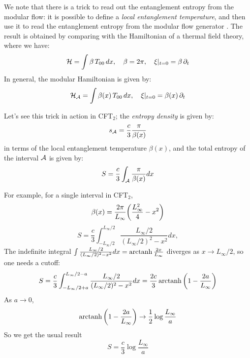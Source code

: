 \documentclass[11pt,a4paper]{article}
\begin{document}
	We note that there is a trick to read out the entanglement entropy from the modular flow: it is possible to define a \textit{local entanglement temperature}, and then use it to read the entanglement entropy from the modular flow generator \cite{Cardy:2016fqc}. The result is obtained by comparing with the Hamiltonian of a thermal field theory, where we have:
	\begin{equation}
	\mathcal{H}=\int \beta\,T_{00}\,dx,\quad \beta = 2\pi,
	\quad \xi|_{t=0} = \beta\,\partial_{t}
	\label{eq:beta_thermal}
	\end{equation}
	In general, the modular Hamiltonian is given by:
	\begin{equation}
	\mathcal{H}_{\mathcal{A}}=\int \beta(x)\, T_{00}\,dx,\quad \xi|_{t=0} = \beta(x)\, \partial_{t}
	\end{equation}
	
	Let's see this trick in action in CFT$_2$; the \textit{entropy density} is given by:
	\begin{equation}
	s_{\mathcal{A}} = \frac{c}{3} \frac{\pi}{\beta(x)}
	\end{equation}
	in terms of the local entanglement temperature $\beta(x)$, and the total entropy of the interval $\mathcal{A}$ is given by:
	\begin{equation}
	S= \frac{c}{3}
		\int_{\mathcal{A}} \frac{\pi}{\beta(x)}dx
	\end{equation}
	
	For example, for a single interval in CFT$_2$,
	\begin{equation}
	\beta(x)=\frac{2\pi}{L_\infty}
		\pqty{\frac{L_\infty^2}{4}-x^2}
	\end{equation}
	\begin{equation}
	S= \frac{c}{3} \int_{-L_\infty/2}^{L_\infty/2}
			\frac{L_\infty/2}{(L_\infty/2)^2-x^2}dx,
	\end{equation}
	The indefinite integral $
		\int \frac{L_\infty/2}{(L_\infty/2)^2-x^2}dx
		= \operatorname{arctanh}\frac{2x}{L_\infty}
	$ diverges as $x\rightarrow L_\infty/2$, so one needs a cutoff:
	\begin{equation}
	S=\frac{c}{3}\int_{-L_\infty/2+a}^{L_\infty/2-a}
		\frac{L_\infty/2}{(L_\infty/2)^2-x^2}dx
	=\frac{2c}{3} \mop{arctanh} \pqty{
			1-\frac{2a}{L_\infty}
		}
	\end{equation}
	As $a\rightarrow 0$,
	\begin{equation}
		\mop{arctanh} \pqty{
			1-\frac{2a}{L_\infty}
		}\rightarrow \frac{1}{2}\log\frac{L_\infty}{a}
	\end{equation}
	So we get the usual result
	\begin{equation}
	S=\frac{c}{3}\log\frac{L_\infty}{a}
	\end{equation}
	
\end{document}
